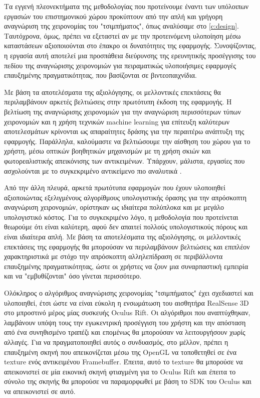 

Τα εγγενή πλεονεκτήματα της μεθοδολογίας που προτείνουμε έναντι των υπόλοιπων εργασιών του επιστημονικού χώρου προκύπτουν από την απλή και γρήγορη αναγνώριση της χειρονομίας του "τσιμπήματος", όπως αναλύσαμε στο \ref{c:design}. Ταυτόχρονα, όμως, πρέπει να εξεταστεί αν με την προτεινόμενη υλοποίηση μέσω καταστάσεων αξιοποιούνται στο έπακρο οι δυνατότητες της εφαρμογής. Συνοψίζοντας, η εργασία αυτή αποτελεί μια προσπάθεια διεύρυνσης της ερευνητικής προσέγγισης του πεδίου της αναγνώρισης χειρονομιών για πειραματικώς υλοποιήσιμες εφαρμογές επαυξημένης πραγματικότητας, που βασίζονται σε βιντεοπαιχνίδια.



Με βάση τα αποτελέσματα της αξιολόγησης, οι μελλοντικές επεκτάσεις θα περιλαμβάνουν αρκετές βελτιώσεις στην πρωτότυπη έκδοση της εφαρμογής. Η βελτίωση της αναγνώρισης χειρονομιών για την αναγνώριση περισσότερων τύπων χειρονομιών και η χρήση τεχνικών machine learning για επίτευξη καλύτερων αποτελεσμάτων κρίνονται ως απαραίτητες δράσης για την περαιτέρω ανάπτυξη της εφαρμογής. Παράλληλα, καλούμαστε να βελτιώσουμε την αίσθηση του χώρου για το χρήστη, μέσω οπτικών βοηθητικών μηχανισμών με τη χρήση σκιών και φωτορεαλιστικής απεικόνισης των αντικειμένων. Υπάρχουν, μάλιστα, εργασίες που ασχολούνται με το συγκεκριμένο αντικείμενο πιο αναλυτικά \cite{Kruijff2010} \cite{Ha2014} \cite{Prachyabrued2014}.



Από την άλλη πλευρά, αρκετά πρωτότυπα εφαρμογών που έχουν υλοποιηθεί αξιοποιώντας εξελιγμένους αλγορίθμους υπολογιστικής όρασης για την απρόσκοπτη αναγνώριση χειρονομιών, ορίστηκαν ως ιδιαίτερα πολύπλοκα και με μεγάλο υπολογιστικό κόστος. Για το συγκεκριμένο λόγο, η μεθοδολογία που προτείνεται θεωρούμε ότι είναι καλύτερη, αφού δεν απαιτεί πολλούς υπολογιστικούς πόρους και είναι ιδιαίτερα απλή. Με βάση τα αποτελέσματα της αξιολόγησης, οι μελλοντικές επεκτάσεις της εφαρμογής θα μπορούσαν να περιλαμβάνουν βελτιώσεις και επιπλέον χαρακτηριστικά με στόχο την απρόσκοπτη αλληλεπίδραση σε περιβάλλοντα επαυξημένης πραγματικότητας, ώστε οι χρήστες να ζουν μια συναρπαστική εμπειρία και να "εμβυθίζονται" όσο γίνεται περισσότερο. 




Ολόκληρος ο αλγόριθμος αναγνώρισης χειρονομίας "τσιμπήματος" έχει σχεδιαστεί και υλοποιηθεί, έτσι ώστε να είναι εύκολη η ενσωμάτωση του αισθητήρα RealSense 3D στο μπροστινό μέρος μίας συσκευής Oculus Rift. Οι αλγόριθμοι που αναπτύχθηκαν, λαμβάνουν υπόψη τους την εγωκεντρική προσέγγιση του χρήστη και την απόσταση από ένα συνηθισμένο τραπέζι και επομένως θα μπορούσαν να λειτουργήσουν χωρίς αλλαγές. Για να πραγματοποιηθεί αυτός ο συνδυασμός, στο μέλλον, πρέπει η επαυξημένη σκηνή που απεικονίζεται μέσω της OpenGL να τοποθετηθεί σε ένα texture ενός αντικειμένου Framebuffer. Έπειτα, αυτό το texture θα μπορούσε να απεικονιστεί σε μία εικονική σκηνή φτιαγμένη για το Oculus Rift και έπειτα το σύνολο της σκηνής θα μπορούσε να παραμορφωθεί με βάση το SDK του Oculus και να απεικονιστεί σε αυτό. 


